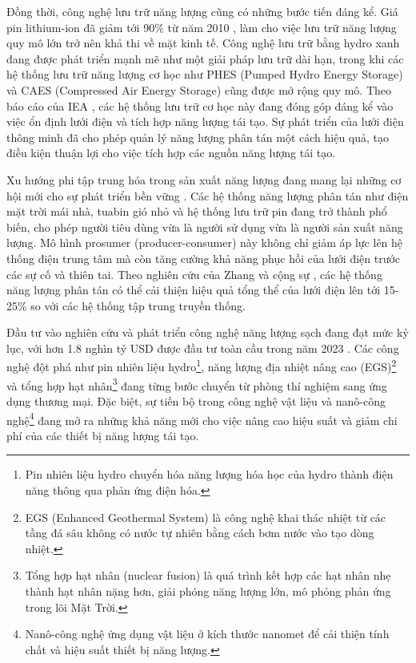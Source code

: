 \documentclass[../main.tex]{subfiles}
\begin{document}
Đồng thời, công nghệ lưu trữ năng lượng cũng có những bước tiến đáng kể. Giá pin lithium-ion đã giảm tới 90\% từ năm 2010 \cite{bloomberg2023bnef}, làm cho việc lưu trữ năng lượng quy mô lớn trở nên khả thi về mặt kinh tế. Công nghệ lưu trữ bằng hydro xanh đang được phát triển mạnh mẽ như một giải pháp lưu trữ dài hạn, trong khi các hệ thống lưu trữ năng lượng cơ học như PHES (Pumped Hydro Energy Storage) \cite{deane2014pumped} và CAES (Compressed Air Energy Storage) \cite{chen2013compressed} cũng được mở rộng quy mô. Theo báo cáo của IEA \cite{iea2023energy_storage}, các hệ thống lưu trữ cơ học này đang đóng góp đáng kể vào việc ổn định lưới điện và tích hợp năng lượng tái tạo. Sự phát triển của lưới điện thông minh đã cho phép quản lý năng lượng phân tán một cách hiệu quả, tạo điều kiện thuận lợi cho việc tích hợp các nguồn năng lượng tái tạo.

Xu hướng phi tập trung hóa trong sản xuất năng lượng đang mang lại những cơ hội mới cho sự phát triển bền vững \cite{irena2023decentralized}. Các hệ thống năng lượng phân tán như điện mặt trời mái nhà, tuabin gió nhỏ và hệ thống lưu trữ pin đang trở thành phổ biến, cho phép người tiêu dùng vừa là người sử dụng vừa là người sản xuất năng lượng. Mô hình prosumer (producer-consumer) này \cite{parag2016prosumer} không chỉ giảm áp lực lên hệ thống điện trung tâm mà còn tăng cường khả năng phục hồi của lưới điện trước các sự cố và thiên tai. Theo nghiên cứu của Zhang và cộng sự \cite{zhang2022distributed}, các hệ thống năng lượng phân tán có thể cải thiện hiệu quả tổng thể của lưới điện lên tới 15-25\% so với các hệ thống tập trung truyền thống.

Đầu tư vào nghiên cứu và phát triển công nghệ năng lượng sạch đang đạt mức kỷ lục, với hơn 1.8 nghìn tỷ USD được đầu tư toàn cầu trong năm 2023 \cite{irena2023renewable}. Các công nghệ đột phá như pin nhiên liệu hydro\footnote{Pin nhiên liệu hydro chuyển hóa năng lượng hóa học của hydro thành điện năng thông qua phản ứng điện hóa.}, năng lượng địa nhiệt nâng cao (EGS)\footnote{EGS (Enhanced Geothermal System) là công nghệ khai thác nhiệt từ các tầng đá sâu không có nước tự nhiên bằng cách bơm nước vào tạo dòng nhiệt.} và tổng hợp hạt nhân\footnote{Tổng hợp hạt nhân (nuclear fusion) là quá trình kết hợp các hạt nhân nhẹ thành hạt nhân nặng hơn, giải phóng năng lượng lớn, mô phỏng phản ứng trong lõi Mặt Trời.} đang từng bước chuyển từ phòng thí nghiệm sang ứng dụng thương mại. Đặc biệt, sự tiến bộ trong công nghệ vật liệu và nanô-công nghệ\footnote{Nanô-công nghệ ứng dụng vật liệu ở kích thước nanomet để cải thiện tính chất và hiệu suất thiết bị năng lượng.} đang mở ra những khả năng mới cho việc nâng cao hiệu suất và giảm chi phí của các thiết bị năng lượng tái tạo.
\end{document}
